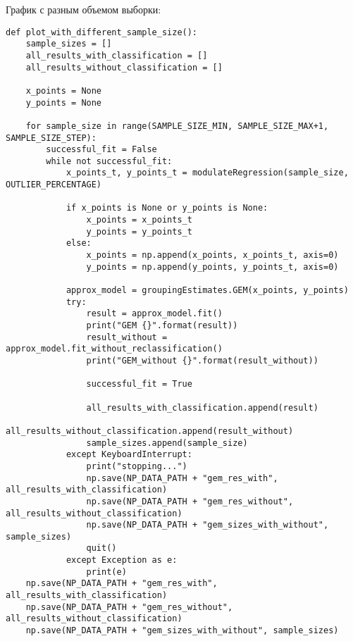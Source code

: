 График с разным объемом выборки:
\begin{Verbatim}[fontsize=\scriptsize]
def plot_with_different_sample_size():
    sample_sizes = []
    all_results_with_classification = []
    all_results_without_classification = []

    x_points = None
    y_points = None

    for sample_size in range(SAMPLE_SIZE_MIN, SAMPLE_SIZE_MAX+1, SAMPLE_SIZE_STEP):
        successful_fit = False
        while not successful_fit:
            x_points_t, y_points_t = modulateRegression(sample_size, OUTLIER_PERCENTAGE)

            if x_points is None or y_points is None:
                x_points = x_points_t
                y_points = y_points_t
            else:
                x_points = np.append(x_points, x_points_t, axis=0)
                y_points = np.append(y_points, y_points_t, axis=0)

            approx_model = groupingEstimates.GEM(x_points, y_points)
            try:
                result = approx_model.fit()
                print("GEM {}".format(result))
                result_without = approx_model.fit_without_reclassification()
                print("GEM_without {}".format(result_without))

                successful_fit = True

                all_results_with_classification.append(result)
                all_results_without_classification.append(result_without)
                sample_sizes.append(sample_size)
            except KeyboardInterrupt:
                print("stopping...")
                np.save(NP_DATA_PATH + "gem_res_with", all_results_with_classification)
                np.save(NP_DATA_PATH + "gem_res_without", all_results_without_classification)
                np.save(NP_DATA_PATH + "gem_sizes_with_without", sample_sizes)
                quit()
            except Exception as e:
                print(e)
    np.save(NP_DATA_PATH + "gem_res_with", all_results_with_classification)
    np.save(NP_DATA_PATH + "gem_res_without", all_results_without_classification)
    np.save(NP_DATA_PATH + "gem_sizes_with_without", sample_sizes)

\end{Verbatim}

